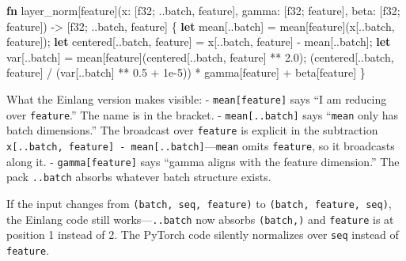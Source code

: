 \documentclass[11pt,titlepage]{article}
\newenvironment{Shaded}{}{}
\newcommand{\DataTypeTok}[1]{\textcolor[rgb]{0.56,0.13,0.00}{#1}}
\newcommand{\DecValTok}[1]{\textcolor[rgb]{0.25,0.63,0.44}{#1}}
\newcommand{\KeywordTok}[1]{\textcolor[rgb]{0.00,0.44,0.13}{\textbf{#1}}}
\newcommand{\NormalTok}[1]{#1}
\newcommand{\OperatorTok}[1]{\textcolor[rgb]{0.40,0.40,0.40}{#1}}
\begin{document}
\begin{Shaded}
\begin{Highlighting}[]
\KeywordTok{fn}\NormalTok{ layer_norm[feature](x: }\OperatorTok{[}\DataTypeTok{f32}\NormalTok{; ..batch, feature}\OperatorTok{]}\NormalTok{, gamma: }\OperatorTok{[}\DataTypeTok{f32}\NormalTok{; feature}\OperatorTok{]}\NormalTok{, beta: }\OperatorTok{[}\DataTypeTok{f32}\NormalTok{; feature}\OperatorTok{]}\NormalTok{)}
\NormalTok{    -> }\OperatorTok{[}\DataTypeTok{f32}\NormalTok{; ..batch, feature}\OperatorTok{]}
\OperatorTok{\{}
    \KeywordTok{let}\NormalTok{ mean}\OperatorTok{[}\NormalTok{..batch}\OperatorTok{]}\NormalTok{ = mean}\OperatorTok{[}\NormalTok{feature}\OperatorTok{]}\NormalTok{(x}\OperatorTok{[}\NormalTok{..batch, feature}\OperatorTok{]}\NormalTok{);}
    \KeywordTok{let}\NormalTok{ centered}\OperatorTok{[}\NormalTok{..batch, feature}\OperatorTok{]}\NormalTok{ = x}\OperatorTok{[}\NormalTok{..batch, feature}\OperatorTok{]}\NormalTok{ - mean}\OperatorTok{[}\NormalTok{..batch}\OperatorTok{]}\NormalTok{;}
    \KeywordTok{let}\NormalTok{ var}\OperatorTok{[}\NormalTok{..batch}\OperatorTok{]}\NormalTok{ = mean}\OperatorTok{[}\NormalTok{feature}\OperatorTok{]}\NormalTok{(centered}\OperatorTok{[}\NormalTok{..batch, feature}\OperatorTok{]}\NormalTok{ ** }\DecValTok{2.0}\NormalTok{);}
\NormalTok{    (centered}\OperatorTok{[}\NormalTok{..batch, feature}\OperatorTok{]}\NormalTok{ / (var}\OperatorTok{[}\NormalTok{..batch}\OperatorTok{]}\NormalTok{ ** }\DecValTok{0.5}\NormalTok{ + }\DecValTok{1}\NormalTok{e-}\DecValTok{5}\NormalTok{)) * gamma}\OperatorTok{[}\NormalTok{feature}\OperatorTok{]}\NormalTok{ + beta}\OperatorTok{[}\NormalTok{feature}\OperatorTok{]}
\OperatorTok{\}}
\end{Highlighting}
\end{Shaded}

What the Einlang version makes visible: - \texttt{mean{[}feature{]}}
says ``I am reducing over \texttt{feature}.'' The name is in the
bracket. - \texttt{mean{[}..batch{]}} says ``\texttt{mean} only has
batch dimensions.'' The broadcast over \texttt{feature} is explicit in
the subtraction
\texttt{x{[}..batch,\ feature{]}\ -\ mean{[}..batch{]}}---\texttt{mean}
omits \texttt{feature}, so it broadcasts along it. -
\texttt{gamma{[}feature{]}} says ``gamma aligns with the feature
dimension.'' The pack \texttt{..batch} absorbs whatever batch structure
exists.

If the input changes from \texttt{(batch,\ seq,\ feature)} to
\texttt{(batch,\ feature,\ seq)}, the Einlang code still
works---\texttt{..batch} now absorbs \texttt{(batch,)} and
\texttt{feature} is at position 1 instead of 2. The PyTorch code
silently normalizes over \texttt{seq} instead of \texttt{feature}.
\end{document}
